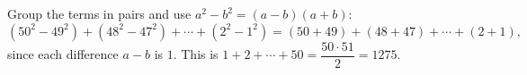 Group the terms in pairs and use $a^2-b^2=(a-b)(a+b)$:
\[
(50^2-49^2)+(48^2-47^2)+\cdots+(2^2-1^2)=(50+49)+(48+47)+\cdots+(2+1),
\]
since each difference $a-b$ is $1$. This is $1+2+\cdots+50=\dfrac{50\cdot51}{2}=\boxed{1275}$.
